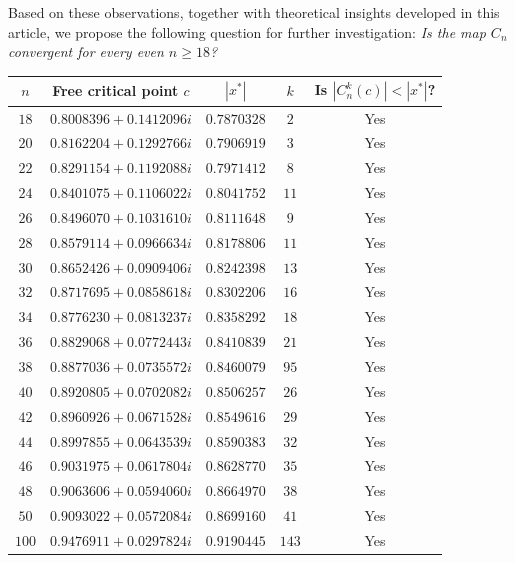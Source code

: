 \documentclass[12pt]{article}
\begin{document}
  Based on these observations, together with theoretical insights developed in this article, we propose the following question for further investigation:
\textit{Is the map $C_n$ convergent for every even $n \geq 18$?}
\begin{table}[h!]
	\centering
	\renewcommand{\arraystretch}{1.3}
	\begin{tabular}{|c|c|c|c|c|}
		\hline
		$n$ & Free critical point $c$ & $|x^*|$ & $k$ & Is $|C_n^k(c)|<|x^*|$?\\
		\hline
		$18$  & $0.8008396 + 0.1412096 i$ & $0.7870328$ & $2$      & Yes \\
		\hline
		$20$  & $0.8162204 + 0.1292766 i$ & $0.7906919$ & $3$      & Yes \\
		\hline
		$22$  & $0.8291154 + 0.1192088 i$ & $0.7971412$ & $8$      & Yes \\
		\hline
		$24$  & $0.8401075 + 0.1106022 i$ & $0.8041752$ & $11$     & Yes \\
		\hline
		$26$  & $0.8496070 + 0.1031610 i$ & $0.8111648$ & $9$      & Yes \\
		\hline
		$28$  & $0.8579114 + 0.0966634 i$ & $0.8178806$ & $11$     & Yes \\
		\hline
		$30$  & $0.8652426 + 0.0909406 i$ & $0.8242398$ & $13$     & Yes \\
		\hline
		$32$  & $0.8717695 + 0.0858618 i$ & $0.8302206$ & $16$     & Yes \\
		\hline
		$34$  & $0.8776230 + 0.0813237 i$ & $0.8358292$ & $18$     & Yes \\
		\hline
		$36$  & $0.8829068 + 0.0772443 i$ & $0.8410839$ & $21$     & Yes \\
		\hline
		$38$  & $0.8877036 + 0.0735572 i$ & $0.8460079$ & $95$     & Yes \\
		\hline
		$40$  & $0.8920805 + 0.0702082 i$ & $0.8506257$ & $26$     & Yes \\
		\hline
		$42$  & $0.8960926 + 0.0671528 i$ & $0.8549616$ & $29$     & Yes \\
		\hline
		$44$  & $0.8997855 + 0.0643539 i$ & $0.8590383$ & $32$     & Yes \\
		\hline
		$46$  & $0.9031975 + 0.0617804 i$ & $0.8628770$ & $35$     & Yes \\
		\hline
		$48$  & $0.9063606 + 0.0594060 i$ & $0.8664970$ & $38$     & Yes \\
		\hline
		$50$  & $0.9093022 + 0.0572084 i$ & $0.8699160$ & $41$     & Yes \\
		\hline
		$100$ & $0.9476911 + 0.0297824 i$ & $0.9190445$ & $143$    & Yes \\

\end{tabular}
\end{table}
\end{document}
